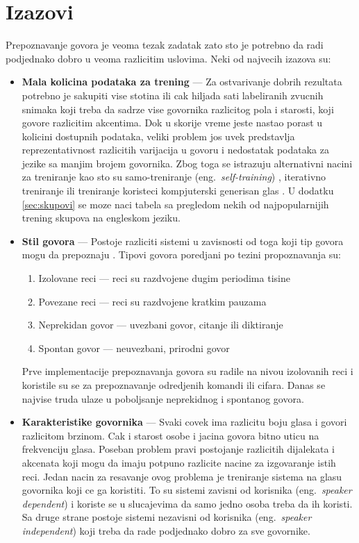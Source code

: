 \documentclass[a4paper]{article}
\begin{document}
\section{Izazovi}
Prepoznavanje govora je veoma tezak zadatak zato sto je potrebno da radi podjednako dobro u veoma razlicitim uslovima.
Neki od najvecih izazova su:
\begin{itemize}
  \item \textbf{Mala kolicina podataka za trening} --- 
  Za ostvarivanje dobrih rezultata potrebno je sakupiti vise stotina ili cak hiljada sati labeliranih zvucnih snimaka koji treba da sadrze vise govornika razlicitog pola i starosti, koji govore razlicitim akcentima. 
  Dok u skorije vreme jeste nastao porast u kolicini dostupnih podataka, veliki problem jos uvek predstavlja reprezentativnost razlicitih varijacija u govoru i nedostatak podataka za jezike sa manjim brojem govornika. 
  Zbog toga se istrazuju alternativni nacini za treniranje kao sto su samo-treniranje (eng.~{\em self-training}) \cite{baevski2020wav2vec}, iterativno treniranje \cite{park2020noisy} ili treniranje koristeci kompjuterski generisan glas \cite{hannun2014deep}. 
  U dodatku \ref{sec:skupovi} se moze naci tabela sa pregledom nekih od najpopularnijih trening skupova na engleskom jeziku.
  
  \item \textbf{Stil govora} --- 
  Postoje razliciti sistemi u zavisnosti od toga koji tip govora mogu da prepoznaju \cite{anusuya2010speech}. Tipovi govora poredjani po tezini propoznavanja su: 
  \begin{enumerate}
    \item Izolovane reci --- reci su razdvojene dugim periodima tisine
    \item Povezane reci --- reci su razdvojene kratkim pauzama
    \item Neprekidan govor --- uvezbani govor, citanje ili diktiranje
    \item Spontan govor --- neuvezbani, prirodni govor 
  \end{enumerate}
  Prve implementacije prepoznavanja govora su radile na nivou izolovanih reci i koristile su se za prepoznavanje odredjenih komandi ili cifara.
  Danas se najvise truda ulaze u poboljsanje neprekidnog i spontanog govora.

  \item \textbf{Karakteristike govornika} ---
  Svaki covek ima razlicitu boju glasa i govori razlicitom brzinom. Cak i starost osobe i jacina govora bitno uticu na frekvenciju glasa.
  Poseban problem pravi postojanje razlicitih dijalekata i akcenata koji mogu da imaju potpuno razlicite nacine za izgovaranje istih reci.
  Jedan nacin za resavanje ovog problema je treniranje sistema na glasu govornika koji ce ga koristiti.
  To su sistemi zavisni od korisnika (eng.~{\em speaker dependent}) i koriste se u slucajevima da samo jedno osoba treba da ih koristi.
  Sa druge strane postoje sistemi nezavisni od korisnika (eng.~{\em speaker independent}) koji treba da rade podjednako dobro za sve govornike.
  

\end{itemize}
\end{document}
